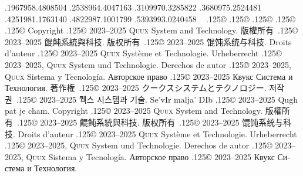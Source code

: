 \documentclass{cookbook}
\begin{document}
{{	.1967958\textwidth .4808504\textwidth
	.2538964\textwidth .4047163\textwidth
	.3109970\textwidth .3285822\textwidth
	.3680975\textwidth .2524481\textwidth
	.4251981\textwidth .1763140\textwidth%
	.4822987\textwidth .1001799\textwidth%
	.5393993\textwidth .0240458\textwidth%
~%
{\lower.125\baselineskip\hbox{\copyright}}
{\lower.125\baselineskip\hbox{\copyright}}
{\lower.125\baselineskip\hbox{\copyright}}
{\lower.125\baselineskip\hbox{\copyright}}
{\lower.125\baselineskip\hbox{\copyright}}
Copyright {\lower.125\baselineskip\hbox{\copyright}}
	2023--2025 \textsc{Quux} System and Technology.
版權所有~{\lower.125\baselineskip\hbox{\copyright}}
	2023--2025 餛飩系統與科技.
版权所有~{\lower.125\baselineskip\hbox{\copyright}}
	2023--2025 馄饨系统与科技.
Droits d'auteur {\lower.125\baselineskip\hbox{\copyright}} %
	2023--2025 \textsc{Quux} Système et Technologie.
Urheberrecht {\lower.125\baselineskip\hbox{\copyright}} %
	2023--2025, \textsc{Quux} System und Technologie.
Derechos de autor {\lower.125\baselineskip\hbox{\copyright}} %
	2023--2025, \textsc{Quux} Sistema y Tecnología.
\foreignlanguage{russian}{Авторское право} %
	{\lower.125\baselineskip\hbox{\copyright}}
	2023–2025 \foreignlanguage{russian}{Квукс Система и Технология.}
著作権~{\lower.125\baselineskip\hbox{\copyright}}
	2023--2025 クークスシステムとテクノロジー.
저작권~{\lower.125\baselineskip\hbox{\copyright}}
	2023--2025 퀙스 시스템과 기술.
Se'vIr malja' DIb {\lower.125\baselineskip\hbox{\copyright}} %
	2023--2025 Qugh pat je cham.
Copyright {\lower.125\baselineskip\hbox{\copyright}}
	2023--2025 \textsc{Quux} System and Technology.
版權所有~{\lower.125\baselineskip\hbox{\copyright}}
	2023--2025 餛飩系統與科技.
版权所有~{\lower.125\baselineskip\hbox{\copyright}}
	2023--2025 馄饨系统与科技.
Droits d'auteur {\lower.125\baselineskip\hbox{\copyright}} %
	2023--2025 \textsc{Quux} Système et Technologie.
Urheberrecht {\lower.125\baselineskip\hbox{\copyright}} %
	2023--2025, \textsc{Quux} System und Technologie.
Derechos de autor {\lower.125\baselineskip\hbox{\copyright}} %
	2023--2025, \textsc{Quux} Sistema y Tecnología.
\foreignlanguage{russian}{Авторское право} %
	{\lower.125\baselineskip\hbox{\copyright}}
	2023–2025 \foreignlanguage{russian}{Квукс Система и Технология.}
}}
\end{document}
